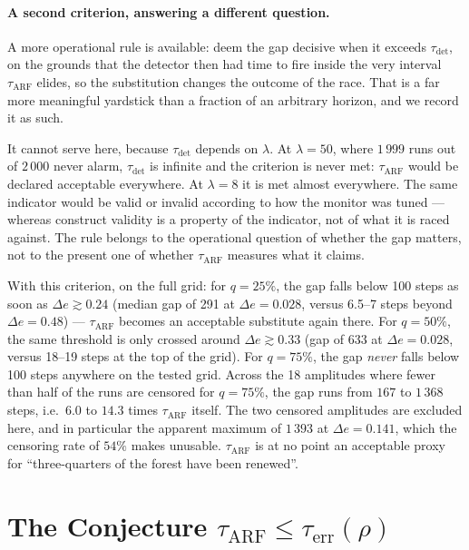 \documentclass[11pt,a4paper]{article}
\begin{document}
\paragraph{A second criterion, answering a different question.} A more operational rule
is available: deem the gap decisive when it exceeds $\tau_{\mathrm{det}}$, on the grounds
that the detector then had time to fire inside the very interval $\tau_{\mathrm{ARF}}$
elides, so the substitution changes the outcome of the race. That is a far more
meaningful yardstick than a fraction of an arbitrary horizon, and we record it as such.

It cannot serve here, because $\tau_{\mathrm{det}}$ depends on $\lambda$. At
$\lambda = 50$, where $1\,999$ runs out of $2\,000$ never alarm, $\tau_{\mathrm{det}}$ is
infinite and the criterion is never met: $\tau_{\mathrm{ARF}}$ would be declared
acceptable everywhere. At $\lambda = 8$ it is met almost everywhere. The same indicator
would be valid or invalid according to how the monitor was tuned --- whereas construct
validity is a property of the indicator, not of what it is raced against. The rule
belongs to the operational question of whether the gap matters, not to the present one of
whether $\tau_{\mathrm{ARF}}$ measures what it claims.

With this criterion, on the full grid: for $q=25\%$, the gap falls below 100 steps as
soon as $\Delta e \gtrsim 0.24$ (median gap of 291 at $\Delta e=0.028$, versus
6.5--7 steps beyond $\Delta e=0.48$) --- $\tau_{\mathrm{ARF}}$ becomes an acceptable
substitute again there. For $q=50\%$, the same threshold is only crossed around
$\Delta e \gtrsim 0.33$ (gap of 633 at $\Delta e=0.028$, versus 18--19 steps at the top
of the grid). For $q=75\%$, the gap \emph{never} falls below 100 steps anywhere on the
tested grid. Across the 18 amplitudes where fewer than half of the runs are censored
for $q = 75\%$, the gap runs
from $167$ to $1\,368$ steps, i.e.\ $6.0$ to $14.3$ times $\tau_{\mathrm{ARF}}$ itself.
The two censored amplitudes are excluded here, and in particular the apparent maximum
of $1\,393$ at $\Delta e = 0.141$, which the censoring rate of $54\%$ makes unusable.
$\tau_{\mathrm{ARF}}$ is at no point an acceptable proxy for ``three-quarters of the
forest have been renewed''.

\section{The Conjecture $\tau_{\mathrm{ARF}} \le \tau_{\mathrm{err}}(\rho)$}
\end{document}
